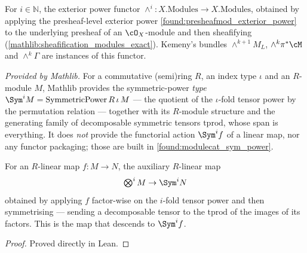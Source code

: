 \begin{definition}\leanok
  \label{found:oxmod_exterior_power}
  For \(i\in\mathbb N\), the exterior power functor
  \(\wedge^i:X.\mathrm{Modules}\to X.\mathrm{Modules}\), obtained by applying the
  presheaf-level exterior power \cref{found:presheafmod_exterior_power} to the
  underlying presheaf of an \(\cO_X\)-module and then sheafifying
  (\cref{mathlib:sheafification_modules_exact}).  Kemeny's bundles
  \(\wedge^{k+1}M_L\), \(\wedge^k\pi^*\cM\) and \(\wedge^k\Gamma\) are instances
  of this functor.
\end{definition}

\begin{definition}
  \label{mathlib:symmetricpower_type}
  \mathlibok
  \textit{Provided by Mathlib.}
  For a commutative (semi)ring \(R\), an index type \(\iota\) and an
  \(R\)-module \(M\), Mathlib provides the symmetric-power \emph{type}
  \(\Sym^i M=\mathrm{SymmetricPower}\,R\,\iota\,M\) --- the quotient of the
  \(\iota\)-fold tensor power by the permutation relation --- together with its
  \(R\)-module structure and the generating family of decomposable symmetric
  tensors \(\mathrm{tprod}\), whose span is everything.  It does \emph{not}
  provide the functorial action \(\Sym^i f\) of a linear map, nor any functor
  packaging; those are built in \cref{found:modulecat_sym_power}.
\end{definition}

\begin{lemma}
  \label{found:sympow_map_aux}
  For an \(R\)-linear map \(f:M\to N\), the auxiliary \(R\)-linear map
  \[
    \textstyle\bigotimes^i M\to\Sym^i N
  \]
  obtained by applying \(f\) factor-wise on the \(i\)-fold tensor power and then
  symmetrising --- sending a decomposable tensor to the \(\mathrm{tprod}\) of the
  images of its factors.  This is the map that descends to \(\Sym^i f\).
\end{lemma}

\begin{proof}

\leanok
  Proved directly in Lean.
\end{proof}

